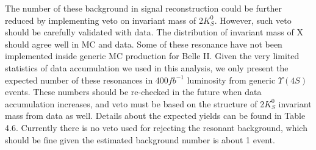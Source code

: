 The number of these background in signal reconstruction could be further reduced by implementing veto on invariant mass of 2$K_S^0$. However, such veto should be carefully validated with data. The distribution of invariant mass of X should agree well in MC and data. Some of these resonance have not been implemented inside generic MC production for Belle II. Given the very limited statistics of data accumulation we used in this analysis, we only present the expected number of these resonances in 400$fb^{-1}$ luminosity from generic $\Upsilon{(4S)}$ events. These numbers should be re-checked in the future when data accumulation increases, and veto must be based on the structure of 2$K_S^0$ invariant mass from data as well. Details about the expected yields can be found in Table 4.6. Currently there is no veto used for rejecting the resonant background, which should be fine given the estimated background number is about 1 event.
